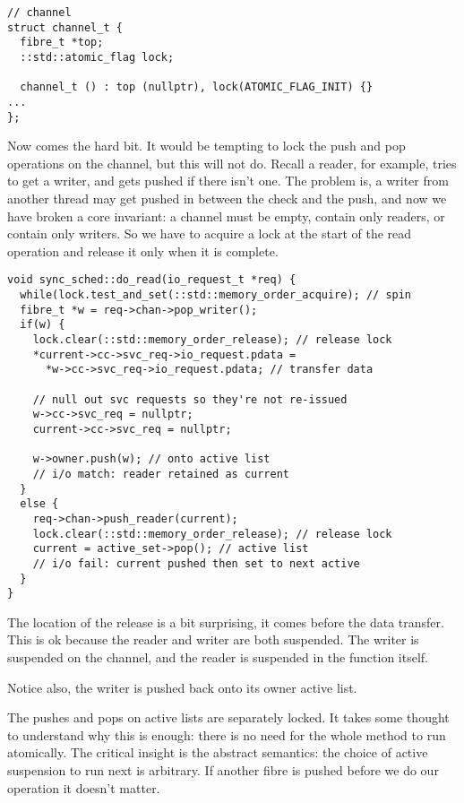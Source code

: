 \documentclass[oneside]{book}
\begin{document}
\begin{verbatim}
// channel
struct channel_t {
  fibre_t *top;
  ::std::atomic_flag lock;
  
  channel_t () : top (nullptr), lock(ATOMIC_FLAG_INIT) {}
...
};
\end{verbatim}

Now comes the hard bit. It would be tempting to lock the push and pop
operations on the channel, but this will not do. Recall a reader, for example,
tries to get a writer, and gets pushed if there isn't one. The problem is,
a writer from another thread may get pushed in between the check and the push,
and now we have broken a core invariant: a channel must be empty, contain
only readers, or contain only writers. So we have to acquire a lock at the start of the
read operation and release it only when it is complete.

\begin{verbatim}
void sync_sched::do_read(io_request_t *req) {
  while(lock.test_and_set(::std::memory_order_acquire); // spin
  fibre_t *w = req->chan->pop_writer();
  if(w) {
    lock.clear(::std::memory_order_release); // release lock
    *current->cc->svc_req->io_request.pdata =
      *w->cc->svc_req->io_request.pdata; // transfer data

    // null out svc requests so they're not re-issued
    w->cc->svc_req = nullptr;
    current->cc->svc_req = nullptr;

    w->owner.push(w); // onto active list
    // i/o match: reader retained as current
  }
  else {
    req->chan->push_reader(current);
    lock.clear(::std::memory_order_release); // release lock
    current = active_set->pop(); // active list
    // i/o fail: current pushed then set to next active
  }
}
\end{verbatim}

The location of the release is a bit surprising, it comes before the 
data transfer. This is ok because the reader and writer are both suspended.
The writer is suspended on the channel, and the reader is suspended
in the function itself.

Notice also, the writer is pushed back onto its owner active list.


The pushes and pops on active lists are separately locked.
It takes some thought to understand why this is enough: there is no
need for the whole method to run atomically. The critical insight
is the abstract semantics: the choice of active suspension to run
next is arbitrary. If another fibre is pushed before we do our
operation it doesn't matter.
\end{document}
